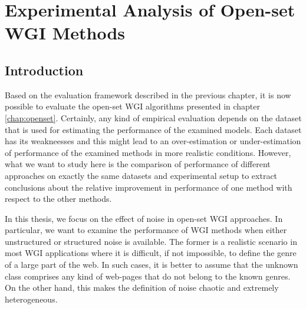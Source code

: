 
\chapter{Experimental Analysis of Open-set WGI Methods}

\label{chap:noise}


\newcommand{\keyword}[1]{\textbf{#1}}
\newcommand{\tabhead}[1]{\textbf{#1}}
\newcommand{\code}[1]{\texttt{#1}}
\newcommand{\file}[1]{\texttt{\bfseries#1}}
\newcommand{\option}[1]{\texttt{\itshape#1}}


\section{Introduction}\label{chap:noise:sec:intro}

Based on the evaluation framework described in the previous chapter, it is now possible to evaluate the open-set WGI algorithms presented in chapter \ref{chap:openset}. Certainly, any kind of empirical evaluation depends on the dataset that is used for estimating the performance of the examined models. Each dataset has its weakneesses and this might lead to an over-estimation or under-estimation of performance of the examined methods in more realistic conditions. However, what we want to study here is the comparison of performance of different approaches on exactly the same datasets and experimental setup to extract conclusions about the relative improvement in performance of one method with respect to the other methods.

In this thesis, we focus on the effect of noise in open-set WGI approaches. In particular, we want to examine the performance of WGI methods when either unstructured or structured noise is available. The former is a realistic scenario in most WGI applications where it is difficult, if not impossible, to define the genre of a large part of the web. In such cases, it is better to assume that the unknown class comprises any kind of web-pages that do not belong to the known genres. On the other hand, this makes the definition of noise chaotic and extremely heterogeneous. 

